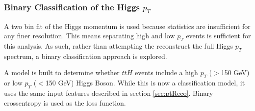\subsubsection{Binary Classification of the Higgs $p_T$}
\label{subsec:binPtApx}
                                                                                                                     
A two bin fit of the Higgs momentum is used because statistics are insufficient for any finer resolution. This means separating high and low $p_T$ events is sufficient for this analysis. As such, rather than attempting the reconstruct the full Higgs $p_T$ spectrum, a binary classification approach is explored.

A model is built to determine whether $t\bar{t}H$ events include a high $p_T$ ($>$150 GeV) or low $p_T$ ($<$150 GeV) Higgs Boson. While this is now a classification model, it uses the same input features described in section \ref{sec:ptReco}. Binary crossentropy is used as the loss function.

\begin{figure}[h!]                                                                                                           
  \\
  \caption{}
  \label{fig:bin2lSSroc}                                                                          
\end{figure}

\begin{figure}[h!]
  \\                                
  \caption{}
  \label{fig:bin3lSroc}
\end{figure} 

\begin{figure}[h!]
  \\                                
  \caption{}
  \label{fig:bin3lFroc}
\end{figure} 

